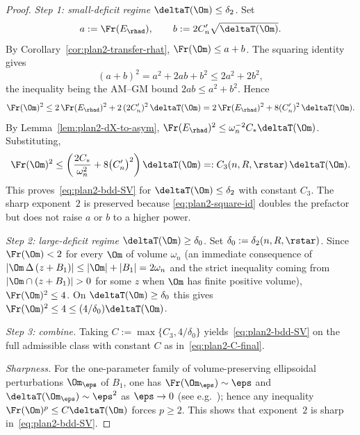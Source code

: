 \begin{proof}
\emph{Step 1: small-deficit regime $\deltaT(\Om)\le\delta_2$.}
Set
\[
   a:=\Fr(E_{\rhad}),
   \qquad b:=2C'_n\sqrt{\deltaT(\Om)}.
\]
By Corollary~\ref{cor:plan2-transfer-rhat},
$\Fr(\Om)\le a+b$. The squaring identity gives
\begin{equation}\label{eq:plan2-square-id}
   (a+b)^2=a^2+2ab+b^2\le 2a^2+2b^2,
\end{equation}
the inequality being the AM--GM bound $2ab\le a^2+b^2$. Hence
\begin{equation}\label{eq:plan2-square}
   \Fr(\Om)^{2}\le 2\,\Fr(E_{\rhad})^{2}+2\,(2C'_n)^{2}\,\deltaT(\Om)
   =2\,\Fr(E_{\rhad})^{2}+8(C'_n)^{2}\,\deltaT(\Om).
\end{equation}
By Lemma~\ref{lem:plan2-dX-to-asym},
$\Fr(E_{\rhad})^{2}\le \omega_n^{-2}C_*\deltaT(\Om)$. Substituting,
\begin{equation}\label{eq:plan2-final-const}
   \Fr(\Om)^{2}
   \le\left(\frac{2C_*}{\omega_n^{2}}+8\bigl(C'_n\bigr)^{2}\right)\deltaT(\Om)
   =:C_3(n,R,\rstar)\,\deltaT(\Om).
\end{equation}
This proves~\eqref{eq:plan2-bdd-SV} for $\deltaT(\Om)\le\delta_2$
with constant $C_3$. The sharp exponent~$2$ is preserved because
\eqref{eq:plan2-square-id} doubles the prefactor but does not raise
$a$ or $b$ to a higher power.

\emph{Step 2: large-deficit regime $\deltaT(\Om)\ge\delta_0$.}
Set $\delta_0:=\delta_2(n,R,\rstar)$. Since
$\Fr(\Om)<2$ for every $\Om$ of volume $\omega_n$ (an immediate
consequence of $|\Om\,\Delta\,(z+B_1)|\le|\Om|+|B_1|=2\omega_n$ and the
strict inequality coming from $|\Om\cap(z+B_1)|>0$ for some $z$ when
$\Om$ has finite positive volume),
$\Fr(\Om)^{2}\le 4$. On $\deltaT(\Om)\ge\delta_0$ this gives
$\Fr(\Om)^{2}\le 4\le(4/\delta_0)\deltaT(\Om)$.

\emph{Step 3: combine.}
Taking $C:=\max\{C_3,4/\delta_0\}$ yields~\eqref{eq:plan2-bdd-SV} on
the full admissible class with constant $C$
as in~\eqref{eq:plan2-C-final}.

\emph{Sharpness.}
For the one-parameter family of volume-preserving ellipsoidal
perturbations $\Om_\eps$ of $B_1$, one has
$\Fr(\Om_\eps)\sim\eps$ and $\deltaT(\Om_\eps)\sim\eps^2$ as
$\eps\to 0$ (see e.g.\ \cite[Introduction]{BraDeP2017}); hence any
inequality $\Fr(\Om)^{p}\le C\deltaT(\Om)$ forces $p\ge 2$. This
shows that exponent~$2$ is sharp in~\eqref{eq:plan2-bdd-SV}.
\end{proof}

